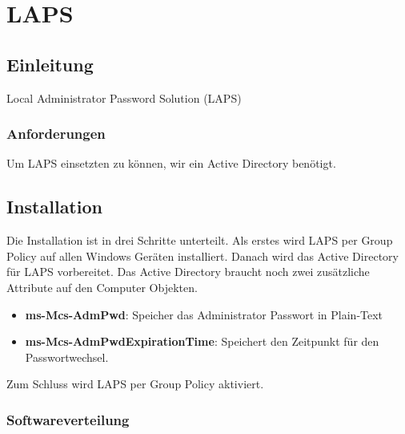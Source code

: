 \chapter{LAPS}
\section{Einleitung}
Local Administrator Password Solution (LAPS)

\subsection{Anforderungen}
Um LAPS einsetzten zu können, wir ein Active Directory benötigt.

\section{Installation}
Die Installation ist in drei Schritte unterteilt.
Als erstes wird LAPS per Group Policy auf allen Windows Geräten installiert.
Danach wird das Active Directory für LAPS vorbereitet.
Das Active Directory braucht noch zwei zusätzliche Attribute auf den Computer Objekten. 
\begin{itemize}
    \item \textbf{ms-Mcs-AdmPwd}: Speicher das Administrator Passwort in Plain-Text
    \item \textbf{ms-Mcs-AdmPwdExpirationTime}: Speichert den Zeitpunkt für den Passwortwechsel.
\end{itemize}

Zum Schluss wird LAPS per Group Policy aktiviert.

\subsection{Softwareverteilung}

